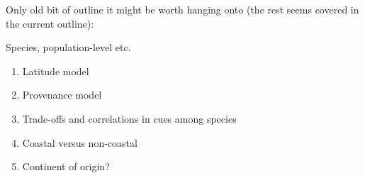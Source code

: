 \documentclass[11pt,letter]{article}
\begin{document}
Only old bit of outline it might be worth hanging onto (the rest seems covered in the current outline):

Species, population-level etc.
\begin{enumerate}
\item Latitude model
\item Provenance model
\item Trade-offs and correlations in cues among species 
\item Coastal versus non-coastal
\item Continent of origin?
\end{enumerate}
\end{document}
